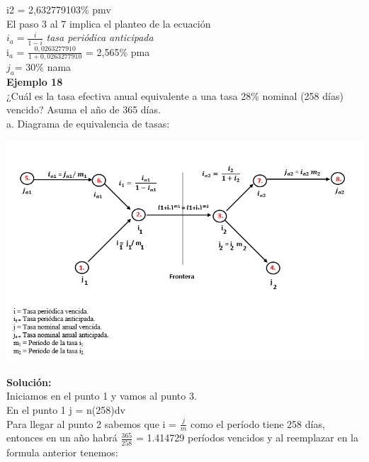 i2 = 2,632779103\% pmv\\

El paso 3 al 7 implica el planteo de la ecuación\\ 


$i_{a} = \frac{i}{1-i}$ \hspace{35 pt} \textit{tasa periódica anticipada}\\

i$_{a}$ = $\frac{0,0263277910}{1+0,0263277910}$ = 2,565\% pma\\

$j_{a} $= 30\% nama\\

\textbf{Ejemplo 18}\\

¿Cuál es la tasa efectiva anual equivalente a una tasa 28\% nominal (258 días) vencido? Asuma el año de 365 días.\\

a. Diagrama de equivalencia de tasas:

\begin{center}
	\includegraphics[height = 9.0 cm]{general}\\
\end{center}

\textbf{Solución:}\\

Iniciamos en el punto 1 y vamos al punto 3.\\
En el punto 1 j = n(258)dv\\

Para llegar al punto 2 sabemos que i = $\frac{j}{m}$ como el período tiene 258 días, entonces en un año habrá $\frac{365}{258}$ = 1.414729 períodos vencidos y al reemplazar en la formula anterior tenemos:\\

